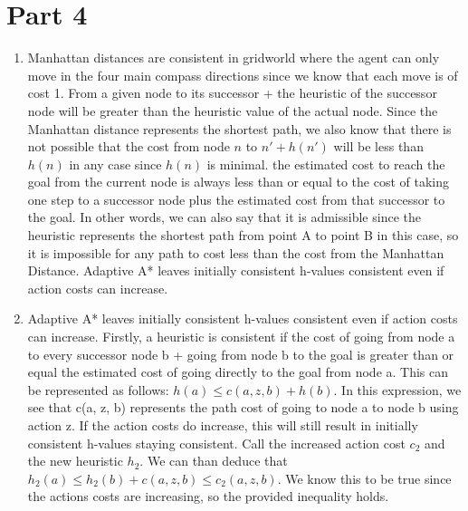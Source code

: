 \documentclass{article}
\begin{document}
\section*{Part 4} \begin{enumerate}[label=\alph*.]
 \item Manhattan distances are consistent in gridworld where the agent can only move in the four main compass directions since we know that each move is of cost 1. From a given node to its successor + the heuristic of the successor node will be greater than the heuristic value of the actual node. Since the Manhattan distance represents the shortest path, we also know that there is not possible that the cost from node $n$ to $n' + h(n')$ will be less than $h(n)$ in any case since $h(n)$ is minimal. the estimated cost to reach the goal from the current node is always less than or equal to the cost of taking one step to a successor node plus the estimated cost from that successor to the goal. In other words, we can also say that it is admissible since the heuristic represents the shortest path from point A to point B in this case, so it is impossible for any path to cost less than the cost from the Manhattan Distance. Adaptive A* leaves initially consistent h-values consistent even if action costs can increase.

 \item Adaptive A* leaves initially consistent h-values consistent even if action costs can increase. Firstly, a heuristic is consistent if the cost of going from node a to every successor node b + going from node b to the goal is greater than or equal the estimated cost of going directly to the goal from node a. This can be represented as follows: \(h(a) \leq c(a, z, b) + h(b)\). In this expression, we see that c(a, z, b) represents the path cost of going to node a to node b using action z. If the action costs do increase, this will still result in initially consistent h-values staying consistent. Call the increased action cost $c_2$ and the new heuristic $h_2$. We can than deduce that \(h_2(a) \leq h_2(b) + c(a, z, b) \leq c_2(a, z, b)\). We know this to be true since the actions costs are increasing, so the provided inequality holds. 

 \end{enumerate}
\end{document}
